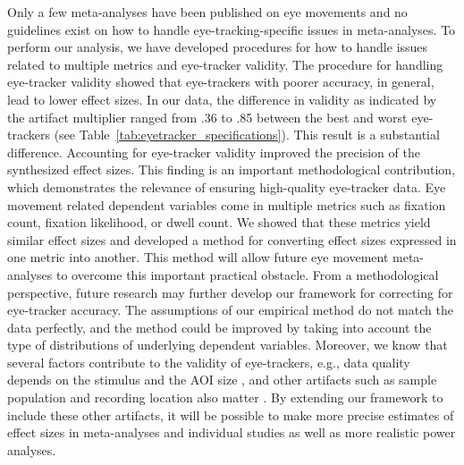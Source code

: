 Only a few meta-analyses have been published on eye movements and no guidelines exist on how to handle eye-tracking-specific issues in meta-analyses. To perform our analysis, we have developed procedures for how to handle issues related to multiple metrics and eye-tracker validity. The procedure for handling eye-tracker validity showed that eye-trackers with poorer accuracy, in general, lead to lower effect sizes. In our data, the difference in validity as indicated by the artifact multiplier ranged from .36 to .85 between the best and worst eye-trackers (see Table~\ref{tab:eyetracker_specifications}). This result is a substantial difference. Accounting for eye-tracker validity improved the precision of the synthesized effect sizes. This finding is an important methodological contribution, which demonstrates the relevance of ensuring high-quality eye-tracker data. Eye movement related dependent variables come in multiple metrics such as fixation count, fixation likelihood, or dwell count. We showed that these metrics yield similar effect sizes and developed a method for converting effect sizes expressed in one metric into another. This method will allow future eye movement meta-analyses to overcome this important practical obstacle. From a methodological perspective, future research may further develop our framework for correcting for eye-tracker accuracy. The assumptions of our empirical method do not match the data perfectly, and the method could be improved by taking into account the type of distributions of underlying dependent variables. Moreover, we know that several factors contribute to the validity of eye-trackers, e.g., data quality depends on the stimulus and the AOI size \citep{orquin2018a}, and other artifacts such as sample population and recording location also matter \citep{nystroem2013a}. By extending our framework to include these other artifacts, it will be possible to make more precise estimates of effect sizes in meta-analyses and individual studies as well as more realistic power analyses.  




